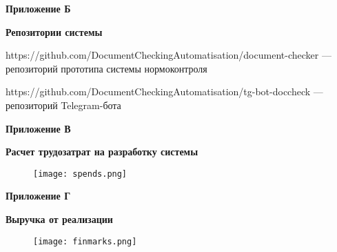 \documentclass{report}
\begin{document}
\newpage

\begin{flushright}
     { \bf Приложение Б}
\end{flushright}

\begin{center}  {\bf Репозитории системы} \end{center}

https://github.com/DocumentCheckingAutomatisation/document-checker --- репозиторий прототипа системы нормоконтроля

https://github.com/DocumentCheckingAutomatisation/tg-bot-doccheck --- репозиторий Telegram-бота

\newpage

\begin{flushright}
     { \bf Приложение В}
\end{flushright}

\begin{center}  {\bf Расчет трудозатрат на разработку системы} \end{center}

\begin{figure}[H]
\centering
    \texttt{[image: spends.png]}
    \captionsetup{justification=centering, format=plain}
\end{figure}

\newpage

\begin{flushright}
     { \bf Приложение Г}
\end{flushright}

\begin{center}  {\bf Выручка от реализации} \end{center}

\begin{figure}[H]
\centering
    \texttt{[image: finmarks.png]}
    \captionsetup{justification=centering, format=plain}
\end{figure}
\end{document}
